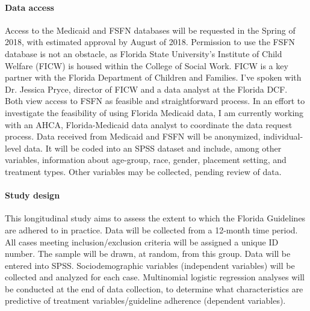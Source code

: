 \documentclass[twocolumn, serif, rga, authordate]{jote-article}
\begin{document}
\paragraph{Data access} Access to the Medicaid and FSFN databases will be
requested in the Spring of 2018, with estimated approval by August of
2018. Permission to use the FSFN database is not an obstacle, as Florida
State University's Institute of Child Welfare (FICW) is housed within
the College of Social Work. FICW is a key partner with the Florida
Department of Children and Families. I've spoken with Dr. Jessica Pryce,
director of FICW and a data analyst at the Florida DCF. Both view access
to FSFN as feasible and straightforward process. In an effort to
investigate the feasibility of using Florida Medicaid data, I am
currently working with an AHCA, Florida-Medicaid data analyst to
coordinate the data request process. Data received from Medicaid and
FSFN will be anonymized, individual-level data. It will be coded into an
SPSS dataset and include, among other variables, information about
age-group, race, gender, placement setting, and treatment types. Other
variables may be collected, pending review of data.

\paragraph{Study design} This longitudinal study aims to assess the extent
to which the Florida Guidelines are adhered to in practice. Data will be
collected from a 12-month time period. All cases meeting
inclusion/exclusion criteria will be assigned a unique ID number. The
sample will be drawn, at random, from this group. Data will be entered
into SPSS. Sociodemographic variables (independent variables) will be
collected and analyzed for each case. Multinomial logistic regression
analyses will be conducted at the end of data collection, to determine
what characteristics are predictive of treatment variables/guideline
adherence (dependent variables).
\end{document}
